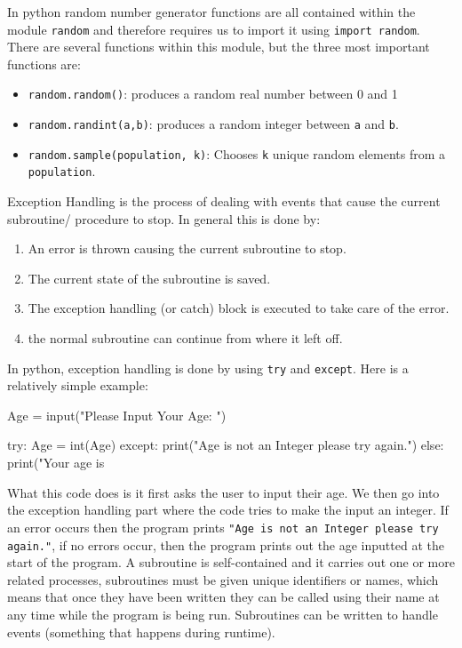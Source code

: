   In python random number generator functions are all contained within the module \verb|random| and therefore requires us to import it using \verb|import random|. There are several functions within this module, but the three most important functions are:
  \begin{itemize}
    \setlength\itemsep{0em}
    \item \verb|random.random()|: produces a random real number between 0 and 1
    \item \verb|random.randint(a,b)|: produces a random integer between \verb|a| and \verb|b|.
    \item \verb|random.sample(population, k)|: Chooses \verb|k| unique random elements from a \verb|population|.
  \end{itemize}
  Exception Handling is the process of dealing with events that cause the current subroutine/ procedure to stop. In general this is done by:
  \begin{enumerate}
    \setlength\itemsep{0em}
    \item An error is thrown causing the current subroutine to stop.
    \item The current state of the subroutine is saved.
    \item The exception handling (or catch) block is executed to take care of the error.
    \item the normal subroutine can continue from where it left off.
  \end{enumerate}
  In python, exception handling is done by using \verb|try| and \verb|except|. Here is a relatively simple example:
  \begin{python}
Age = input("Please Input Your Age: ")

try:
	Age = int(Age)
except:
	print("Age is not an Integer please try again.")
else:
	print("Your age is %
\end{python}
  What this code does is it first asks the user to input their age. We then go into the exception handling part where the code tries to make the input an integer. If an error occurs then the program prints \verb|"Age is not an Integer please try again."|, if no errors occur, then the program prints out the age inputted at the start of the program.
  A subroutine is self-contained and it carries out one or more related processes, subroutines must be given unique identifiers or names, which means that once they have been written they can be called using their name at any time while the program is being run. Subroutines can be written to handle events (something that happens during runtime).\\
